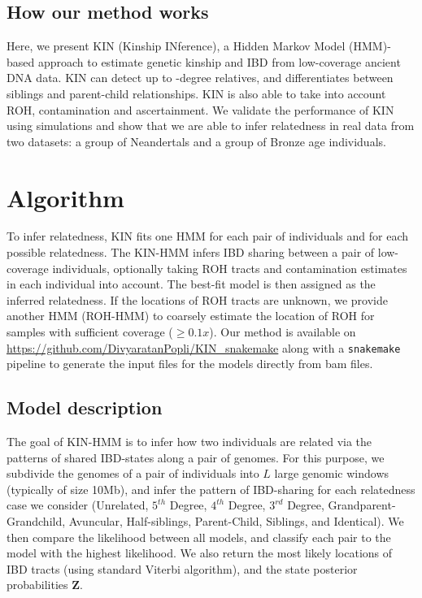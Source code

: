 \documentclass[12pt, letterpaper]{article}
\newcommand{\BZ}{\mathbf{Z}}
\begin{document}
\subsection{How our method works}
Here, we present KIN (Kinship INference), a Hidden Markov Model (HMM)-based approach to estimate genetic kinship and IBD from low-coverage ancient DNA data. KIN can detect up to -degree relatives, and differentiates between siblings and parent-child relationships. KIN is also able to take into account ROH, contamination and ascertainment. We validate the performance of KIN using simulations and show that we are able to infer relatedness in real data from two datasets: a group of Neandertals and a group of Bronze age individuals.


\section{Algorithm}\label{new_approaches}
To infer relatedness, KIN fits one HMM for each pair of individuals and for each possible relatedness. The KIN-HMM infers IBD sharing between a pair of low-coverage individuals, optionally taking ROH tracts and contamination estimates in each individual into account. The best-fit model is then assigned as the inferred relatedness. If the locations of ROH tracts are unknown, we provide another HMM (ROH-HMM) to coarsely estimate the location of ROH for samples with sufficient coverage ($\geq 0.1x$). Our method is available on \url{https://github.com/DivyaratanPopli/KIN_snakemake} along with a \texttt{snakemake} \cite{koster_snakemakescalable_2012} pipeline to generate the input files for the models directly from bam files. 


\subsection{Model description}\label{method_overview} 
The goal of KIN-HMM is to infer how two individuals are related via the patterns of shared IBD-states along a pair of genomes. For this purpose,  we subdivide the genomes of a pair of individuals into $L$ large genomic windows (typically of size 10Mb), and infer the pattern of IBD-sharing for each relatedness case we consider (Unrelated, $5^{th}$ Degree, $4^{th}$ Degree, $3^{rd}$ Degree, Grandparent-Grandchild, Avuncular, Half-siblings, Parent-Child, Siblings, and Identical). We then compare the likelihood between all models, and classify each pair to the model with the highest likelihood. We also return the most likely locations of IBD tracts (using standard Viterbi algorithm), and the state posterior probabilities $\BZ$. 
\end{document}
